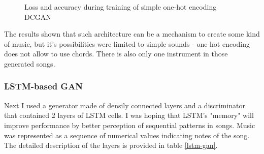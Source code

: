 \documentclass[]{article}
\begin{document}
\begin{figure}[!h]
	\centering
	\caption{Loss and accuracy during training of simple one-hot encoding DCGAN}
\end{figure}

The results shown that such architecture can be a mechanism to create some kind of music, but it's possibilities were limited to simple sounds - one-hot encoding does not allow to use chords. There is also only one instrument in those generated songs.

\subsubsection{LSTM-based GAN}

Next I used a generator made of densily connected layers and a discriminator that contained 2 layers of LSTM cells. I was hoping that LSTM's "memory" will improve performance by better perception of sequential patterns in songs. Music was represented as a sequence of numerical values indicating notes of the song. The detailed description of the layers is provided in table \ref{lstm-gan}. 
\end{document}
